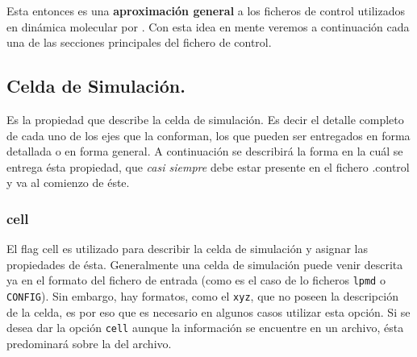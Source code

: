 Esta entonces es una \textbf{aproximaci\'on general} a los ficheros de control utilizados en din\'amica molecular por {\lpmd}. Con esta idea en mente veremos a continuaci\'on cada una de las secciones principales del fichero de control.

\subsection{Celda de Simulaci\'on.}

Es la propiedad que describe la celda de simulaci\'on. Es decir el detalle completo de cada uno de los ejes que la conforman, los que pueden ser entregados en forma detallada o en forma general. A continuaci\'on se describir\'a la forma en la cu\'al se entrega \'esta propiedad, que \textit{casi siempre} debe estar presente en el fichero .control y va al comienzo de \'este.

\subsubsection{cell}

El flag cell es utilizado para describir la celda de simulaci\'on y asignar las propiedades de \'esta. Generalmente una celda de simulaci\'on puede venir descrita ya en el formato del fichero de entrada (como es el caso de lo ficheros \texttt{lpmd} o \texttt{CONFIG}). Sin embargo, hay formatos, como el \texttt{xyz}, que no poseen la descripci\'on de la celda, es por eso que es necesario en algunos casos utilizar esta opci\'on. Si se desea dar la opci\'on \verb|cell| aunque la informaci\'on se encuentre en un archivo, \'esta predominar\'a sobre la del archivo.

